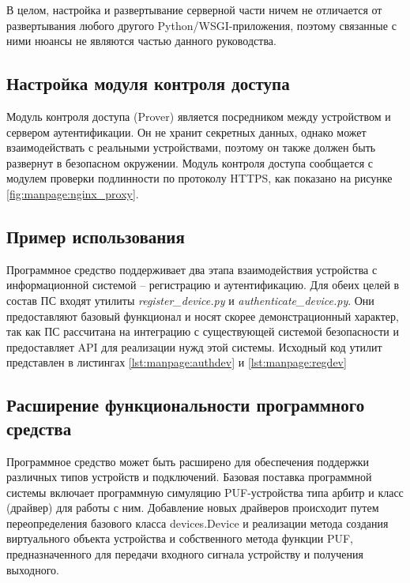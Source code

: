 В целом, настройка и развертывание серверной части ничем не отличается от развертывания любого другого Python/WSGI-приложения, поэтому связанные с ними нюансы не являются частью данного руководства.

\subsection{Настройка модуля контроля доступа}
\label{sec:manpage:client_setup}
Модуль контроля доступа (Prover) является посредником между устройством и сервером аутентификации. Он не хранит секретных данных, однако может взаимодействать с реальными устройствами, поэтому он также должен быть развернут в безопасном окружении. Модуль контроля доступа сообщается с модулем проверки подлинности по протоколу HTTPS, как показано на рисунке \ref{fig:manpage:nginx_proxy}.


\subsection{Пример использования}
Программное средство поддерживает два этапа взаимодействия устройства с информационной системой -- регистрацию и аутентификацию. Для обеих целей в состав ПС входят утилиты \emph{register\_device.py} и \emph{authenticate\_device.py}. Они предоставляют базовый функционал и носят скорее демонстрационный характер, так как ПС рассчитана на интеграцию с существующей системой безопасности и предоставляет API для реализации нужд этой системы. Исходный код утилит представлен в листингах \ref{lst:manpage:authdev} и \ref{lst:manpage:regdev}





\subsection{Расширение функциональности программного средства}
Программное средство может быть расширено для обеспечения поддержки различных типов устройств и подключений. Базовая поставка программной системы включает программную симуляцию PUF-устройства типа арбитр и класс (драйвер) для работы с ним. Добавление новых драйверов происходит путем переопределения базового класса devices.Device и реализации метода создания виртуального объекта устройства и собственного метода функции PUF, предназначенного для передачи входного сигнала устройству и получения выходного.




